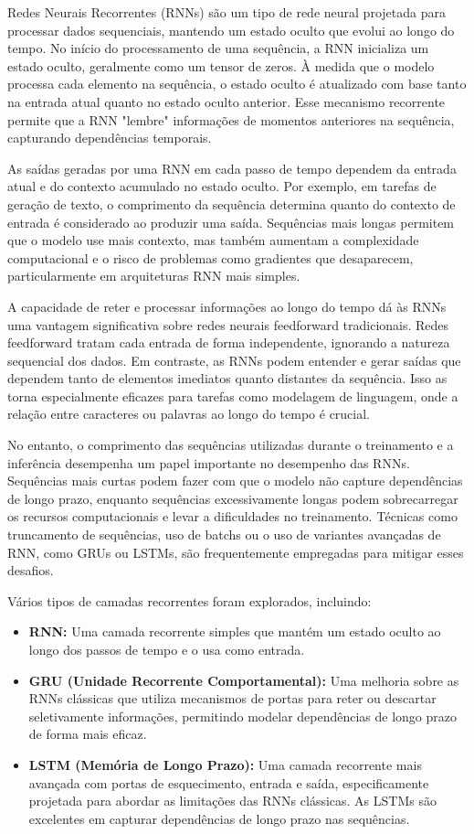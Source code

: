\documentclass[a4paper,12pt]{article}
\begin{document}
Redes Neurais Recorrentes (RNNs) são um tipo de rede neural projetada para processar dados sequenciais, mantendo um estado oculto que evolui ao longo do tempo. No início do processamento de uma sequência, a RNN inicializa um estado oculto, geralmente como um tensor de zeros. À medida que o modelo processa cada elemento na sequência, o estado oculto é atualizado com base tanto na entrada atual quanto no estado oculto anterior. Esse mecanismo recorrente permite que a RNN "lembre" informações de momentos anteriores na sequência, capturando dependências temporais.

As saídas geradas por uma RNN em cada passo de tempo dependem da entrada atual e do contexto acumulado no estado oculto. Por exemplo, em tarefas de geração de texto, o comprimento da sequência determina quanto do contexto de entrada é considerado ao produzir uma saída. Sequências mais longas permitem que o modelo use mais contexto, mas também aumentam a complexidade computacional e o risco de problemas como gradientes que desaparecem, particularmente em arquiteturas RNN mais simples.

A capacidade de reter e processar informações ao longo do tempo dá às RNNs uma vantagem significativa sobre redes neurais feedforward tradicionais. Redes feedforward tratam cada entrada de forma independente, ignorando a natureza sequencial dos dados. Em contraste, as RNNs podem entender e gerar saídas que dependem tanto de elementos imediatos quanto distantes da sequência. Isso as torna especialmente eficazes para tarefas como modelagem de linguagem, onde a relação entre caracteres ou palavras ao longo do tempo é crucial.

No entanto, o comprimento das sequências utilizadas durante o treinamento e a inferência desempenha um papel importante no desempenho das RNNs. Sequências mais curtas podem fazer com que o modelo não capture dependências de longo prazo, enquanto sequências excessivamente longas podem sobrecarregar os recursos computacionais e levar a dificuldades no treinamento. Técnicas como truncamento de sequências, uso de batchs ou o uso de variantes avançadas de RNN, como GRUs ou LSTMs, são frequentemente empregadas para mitigar esses desafios.

Vários tipos de camadas recorrentes foram explorados, incluindo:
\begin{itemize}
\item \textbf{RNN:} Uma camada recorrente simples que mantém um estado oculto ao longo dos passos de tempo e o usa como entrada.
\item \textbf{GRU (Unidade Recorrente Comportamental):} Uma melhoria sobre as RNNs clássicas que utiliza mecanismos de portas para reter ou descartar seletivamente informações, permitindo modelar dependências de longo prazo de forma mais eficaz.
\item \textbf{LSTM (Memória de Longo Prazo):} Uma camada recorrente mais avançada com portas de esquecimento, entrada e saída, especificamente projetada para abordar as limitações das RNNs clássicas. As LSTMs são excelentes em capturar dependências de longo prazo nas sequências.
\end{itemize}
\end{document}
